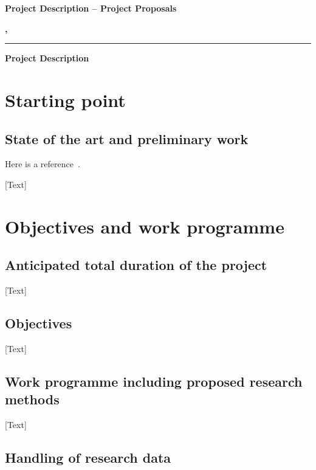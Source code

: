 





\textbf{Project Description -- Project Proposals}
\bigskip
\bigskip

\textbf{\Author, \City}
\bigskip

\textbf{\Title}
\bigskip
\hrule
\bigskip

\textbf{\Large Project Description}

\section{Starting point}

\subsection*{State of the art and preliminary work}

Here is a reference~\cite{voges_2021_an}.

[Text]

\section{Objectives and work programme}

\subsection{Anticipated total duration of the project}

[Text]

\subsection{Objectives}

[Text]

\subsection{Work programme including proposed research methods}

[Text]

\subsection{Handling of research data}

